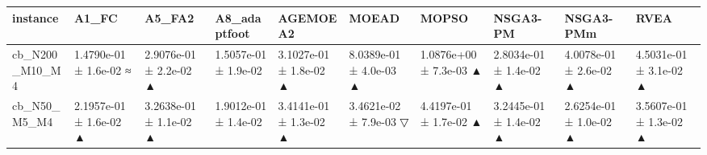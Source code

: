 \begin{tabular}{llllllllll}
\toprule
instance & A1\_FC & A5\_FA2 & A8\_adaptfoot & AGEMOEA2 & MOEAD & MOPSO & NSGA3-PM & NSGA3-PMm & RVEA \\
\midrule
cb\_N200\_M10\_M4 & 1.4790e-01 ± 1.6e-02 ≈ & 2.9076e-01 ± 2.2e-02 ▲ & 1.5057e-01 ± 1.9e-02 & 3.1027e-01 ± 1.8e-02 ▲ & 8.0389e-01 ± 4.0e-03 ▲ & 1.0876e+00 ± 7.3e-03 ▲ & 2.8034e-01 ± 1.4e-02 ▲ & 4.0078e-01 ± 2.6e-02 ▲ & 4.5031e-01 ± 3.1e-02 ▲ \\
cb\_N50\_M5\_M4 & 2.1957e-01 ± 1.6e-02 ▲ & 3.2638e-01 ± 1.1e-02 ▲ & 1.9012e-01 ± 1.4e-02 & 3.4141e-01 ± 1.3e-02 ▲ & 3.4621e-02 ± 7.9e-03 ▽ & 4.4197e-01 ± 1.7e-02 ▲ & 3.2445e-01 ± 1.4e-02 ▲ & 2.6254e-01 ± 1.0e-02 ▲ & 3.5607e-01 ± 1.3e-02 ▲ \\
\bottomrule
\end{tabular}

